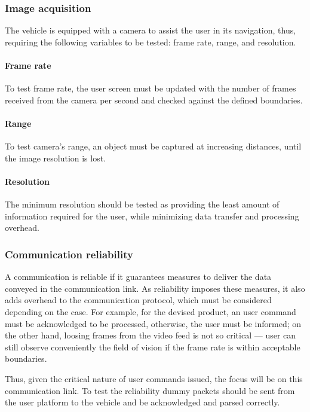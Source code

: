 \subsubsection{Image acquisition}%
\label{sec:orgb1f5c2a}
The vehicle is equipped with a camera to assist the user in its navigation,
thus, requiring the following variables to be tested: frame rate, range, and resolution.

\paragraph{Frame rate}%
\label{sec:frame-rate-test}
To test frame rate, the user screen must be updated with the number of frames
received from the camera per second and checked against the defined boundaries.

\paragraph{Range}%
\label{sec:range-test}
To test camera's range, an object must be captured at
increasing distances, until the image resolution is lost.

\paragraph{Resolution}%
\label{sec:resolution-test}
The minimum resolution should be tested as providing the least amount of
information required for the user, while minimizing data transfer and processing overhead.

\subsubsection{Communication reliability}%
\label{sec:comm-reli}
A communication is reliable if it guarantees measures to deliver the data
conveyed in the communication link. As reliability imposes these measures, it
also adds overhead to the communication protocol, which must be considered
depending on the case. For example, for the devised product, an user command
must be acknowledged to be processed, otherwise, the user must be informed; on
the other hand, loosing frames from the video feed is not so critical --- user
can still observe conveniently the field of vision if the frame rate is within
acceptable boundaries. 

Thus, given the critical nature of user commands issued, the focus will be on
this communication link. To test the reliability dummy packets should be sent
from the user platform to the vehicle and be acknowledged and parsed correctly.

